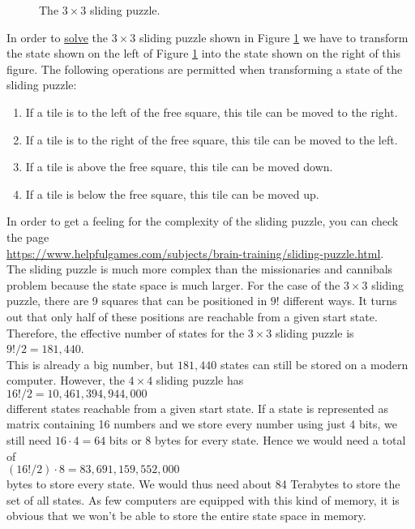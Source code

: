 \begin{figure}[!ht]
\centering
{}
\caption{The $3 \times 3$ sliding puzzle.}
\label{fig:8-puzzle.pdf}
\end{figure}

In order to \href{http://www.artbylogic.com/puzzles/numSlider/numberShuffle.htm?rows=3&cols=3&sqr=1}{solve} the $3 \times 3$ sliding puzzle shown in Figure \ref{fig:8-puzzle.pdf} we have to
transform the state shown on the left of Figure \ref{fig:8-puzzle.pdf} into the state shown on the
right of this figure.  The following operations are permitted when transforming a state of the
sliding puzzle:
\begin{enumerate}
\item If a tile is to the left  of the free square, this tile can be moved to the right.
\item If a tile is to the right of the free square, this tile can be moved to the left.
\item If a tile is above           the free square, this tile can be moved down.
\item If a tile is below           the free square, this tile can be moved up.
\end{enumerate}
In order to get a feeling for the complexity of the sliding puzzle, you can check the page
\\[0.2cm]
\hspace*{1.3cm}
\href{https://www.helpfulgames.com/subjects/brain-training/sliding-puzzle.html}{https://www.helpfulgames.com/subjects/brain-training/sliding-puzzle.html}.
\\[0.2cm]
The sliding puzzle is much more complex than the missionaries and cannibals problem because the
state space is much larger.  For the case of the $3 \times 3$ sliding puzzle, there are 9 squares
that can be positioned in $9!$ different ways.  It turns out that only half of these positions are
reachable from a given start state.  Therefore, the effective number of states for the $3 \times 3$
sliding puzzle is
\\[0.2cm]
\hspace*{1.3cm}
$9! / 2 = 181,440$.
\\[0.2cm]
This is already a big number, but $181,440$ states can still be stored on a modern computer.  However, the
$4 \times 4$ sliding puzzle has
\\[0.2cm]
\hspace*{1.3cm}
$16!/2 = 10,461,394,944,000$
\\[0.2cm]
different states reachable from a given start state.  If a state is represented as matrix containing
16 numbers and we store every number using just 4 bits, we still need $16 \cdot 4 = 64$ bits or 8
bytes for every state.  Hence we would need a total of
\\[0.2cm]
\hspace*{1.3cm}
$(16! / 2) \cdot 8 = 83,691,159,552,000$
\\[0.2cm]
bytes to store every state. We would thus need about 84 Terabytes to store the set of all states.  As few
computers are equipped with this kind of memory, it is obvious that we won't be able to store the
entire state space in memory.

